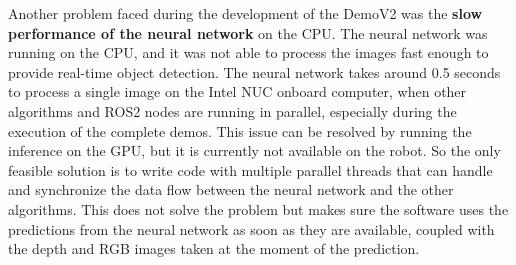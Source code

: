 Another problem faced during the development of the DemoV2 was the \textbf{slow performance of the neural network}
on the CPU. The neural network was running on the CPU, and it was not able to process the images fast enough
to provide real-time object detection. The neural network takes around 0.5 seconds to process a single image
on the Intel NUC onboard computer, when other algorithms and ROS2 nodes are running in parallel,
especially during the execution of the complete demos. This issue can be resolved by running the inference
on the GPU, but it is currently not available on the robot. So the only feasible solution is to write code
with multiple parallel threads that can handle and synchronize the data flow between the neural network
and the other algorithms. This does not solve the problem but makes sure the software uses the
predictions from the neural network as soon as they are available, coupled with the depth and RGB
images taken at the moment of the prediction.
